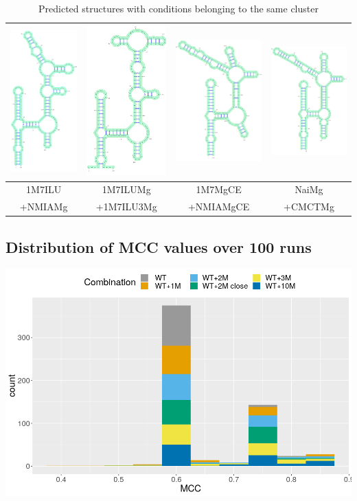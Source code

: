 \documentclass[11pt]{article} %
\begin{document}
\begin{table}
\newcommand{\MyScale}{.2}
\begin{tabular}{@{}cccc@{}}
 \includegraphics[scale=\MyScale]{graphs/Supp_structures/1M7ILU_NMIAMg}& \includegraphics[scale=\MyScale]{graphs/Supp_structures/1M7ILUMg_1M7ILU3Mg}& \includegraphics[scale=\MyScale]{graphs/Supp_structures/1M7MgCE_NMIAMgCE}& \includegraphics[scale=\MyScale]{graphs/Supp_structures/NaiMg_CMCTMg}\\
 \midrule
1M7ILU&1M7ILUMg&1M7MgCE&NaiMg\\
+NMIAMg&+1M7ILU3Mg&+NMIAMgCE&+CMCTMg\\
\end{tabular}
\caption{Predicted structures with conditions belonging to the same cluster}
\end{table}

\subsection{Distribution of MCC values over 100 runs}
\includegraphics[width=\linewidth]{graphs/histog}
\end{document}
